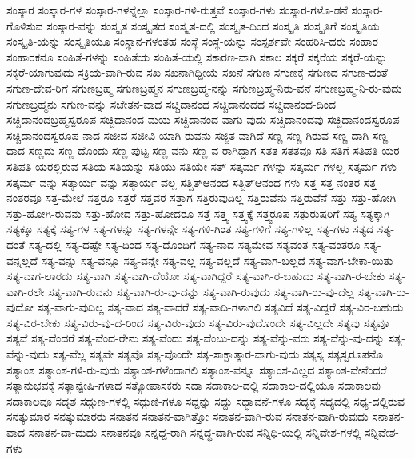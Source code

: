 {ಸಂಸ್ಕಾರ
ಸಂಸ್ಕಾರ-ಗಳ
ಸಂಸ್ಕಾರ-ಗಳನ್ನೆಲ್ಲಾ
ಸಂಸ್ಕಾರ-ಗಳಿ-ರುತ್ತವೆ
ಸಂಸ್ಕಾರ-ಗಳು
ಸಂಸ್ಕಾರ-ಗಳೊ-ಡನೆ
ಸಂಸ್ಕಾರ-ಗೊಳಿಸುವ
ಸಂಸ್ಕಾರ-ವನ್ನು
ಸಂಸ್ಕೃತ
ಸಂಸ್ಕೃತದ
ಸಂಸ್ಕೃತ-ದಲ್ಲಿ
ಸಂಸ್ಕೃತ-ದಿಂದ
ಸಂಸ್ಕೃತಿ
ಸಂಸ್ಕೃತಿಗೆ
ಸಂಸ್ಕೃತಿಯ
ಸಂಸ್ಕೃತಿ-ಯನ್ನು
ಸಂಸ್ಕೃತಿಯೂ
ಸಂಸ್ಥಾನ-ಗಳಂತಹ
ಸಂಸ್ಥೆ
ಸಂಸ್ಥೆ-ಯನ್ನು
ಸಂಸ್ಪರ್ಶವೇ
ಸಂಹರಿಸಿ-ದರು
ಸಂಹಾರ
ಸಂಹಾರಕನೂ
ಸಂಹಿತೆ-ಗಳನ್ನು
ಸಂಹಿತೆಯ
ಸಂಹಿತೆ-ಯಲ್ಲಿ
ಸಕಾರಣ-ವಾಗಿ
ಸಕಾಲ
ಸಕ್ಕರೆ
ಸಕ್ಕರೆಯ
ಸಕ್ಕರೆ-ಯನ್ನು
ಸಕ್ಕರೆ-ಯಾಗುವುದು
ಸಕ್ರಿಯ-ವಾಗಿ-ರುವ
ಸಖ
ಸಖನಾಗಿದ್ದೀಯೆ
ಸಖನೆ
ಸಗುಣ
ಸಗುಣಕ್ಕೆ
ಸಗುಣದ
ಸಗುಣ-ದಂತೆ
ಸಗುಣ-ದೇವ-ರಿಗೆ
ಸಗುಣಬ್ರಹ್ಮ
ಸಗುಣಬ್ರಹ್ಮನ
ಸಗುಣಬ್ರಹ್ಮ-ನನ್ನು
ಸಗುಣಬ್ರಹ್ಮ-ನಿರು-ವನೆ
ಸಗುಣಬ್ರಹ್ಮ-ನಿ-ರು-ವುದು
ಸಗುಣಬ್ರಹ್ಮನು
ಸಗುಣ-ವನ್ನು
ಸಚೇತನ-ವಾದ
ಸಚ್ಚಿದಾನಂದ
ಸಚ್ಚಿದಾನಂದದ
ಸಚ್ಚಿದಾನಂದ-ದಿಂದ
ಸಚ್ಚಿದಾನಂದಬ್ರಹ್ಮಸ್ವರೂಪ
ಸಚ್ಚಿದಾನಂದ-ಮಯ
ಸಚ್ಚಿದಾನಂದ-ವಾಗು-ವುದು
ಸಚ್ಚಿದಾನಂದವು
ಸಚ್ಚಿದಾನಂದಸ್ವರೂಪ
ಸಚ್ಚಿದಾನಂದಸ್ವರೂಪ-ನಾದ
ಸಜೀವ
ಸಜೀವಿ-ಯಾಗಿ-ರುವನು
ಸಜ್ಜಿತ-ವಾಗಿದೆ
ಸಣ್ಣ
ಸಣ್ಣ-ಗಿರುವ
ಸಣ್ಣ-ದಾಗಿ
ಸಣ್ಣ-ದಾದ
ಸಣ್ಣದು
ಸಣ್ಣ-ದೊಂದು
ಸಣ್ಣ-ಪುಟ್ಟ
ಸಣ್ಣ-ವನು
ಸಣ್ಣ-ವ-ರಾಗಿದ್ದಾಗ
ಸತತ
ಸತತವೂ
ಸತಿ
ಸತಿಗೆ
ಸತಿಪತಿ-ಯರ
ಸತಿಪತಿ-ಯರಲ್ಲಿರುವ
ಸತಿಯ
ಸತಿಯನ್ನು
ಸತಿಯು
ಸತಿಯೇ
ಸತ್
ಸತ್ಕರ್ಮ-ಗಳನ್ನು
ಸತ್ಕರ್ಮ-ಗಳಲ್ಲ
ಸತ್ಕರ್ಮ-ಗಳು
ಸತ್ಕರ್ಮ-ವನ್ನು
ಸತ್ಕಾರ್ಯ-ವನ್ನು
ಸತ್ಕಾರ್ಯ-ವಲ್ಲ
ಸತ್ಚಿತ್ಆನಂದ
ಸತ್ಚಿತ್ಆನಂದ-ಗಳು
ಸತ್ತ
ಸತ್ತ-ನಂತರ
ಸತ್ತ-ನಂತರವೂ
ಸತ್ತ-ಮೇಲೆ
ಸತ್ತರೂ
ಸತ್ತರೆ
ಸತ್ತವರ
ಸತ್ತಾಗ
ಸತ್ತಿರುವುದಿಲ್ಲ
ಸತ್ತಿರುವೆನು
ಸತ್ತಿರುವೆನೆ
ಸತ್ತು
ಸತ್ತು-ಹೋಗಿ
ಸತ್ತು-ಹೋಗಿ-ರುವನು
ಸತ್ತು-ಹೋದ
ಸತ್ತು-ಹೋದರೂ
ಸತ್ತೆ
ಸತ್ತ್ವ
ಸತ್ತ್ವಕ್ಕೆ
ಸತ್ತ್ವರೂಪ
ಸತ್ಪುರುಷರಿಗೆ
ಸತ್ಯ
ಸತ್ಯಕ್ಕಾಗಿ
ಸತ್ಯಕ್ಕೂ
ಸತ್ಯಕ್ಕೆ
ಸತ್ಯ-ಗಳ
ಸತ್ಯ-ಗಳನ್ನು
ಸತ್ಯ-ಗಳನ್ನೇ
ಸತ್ಯ-ಗಳಿ-ಗಿಂತ
ಸತ್ಯ-ಗಳಿಗೆ
ಸತ್ಯ-ಗಳಿಲ್ಲ
ಸತ್ಯ-ಗಳು
ಸತ್ಯದ
ಸತ್ಯ-ದಂತೆ
ಸತ್ಯ-ದಲ್ಲಿ
ಸತ್ಯ-ದಷ್ಟೇ
ಸತ್ಯ-ದಿಂದ
ಸತ್ಯ-ದೊಂದಿಗೆ
ಸತ್ಯ-ನಾದ
ಸತ್ಯಮೇವ
ಸತ್ಯವಂತ
ಸತ್ಯ-ವಂತರೂ
ಸತ್ಯ-ವನ್ನಲ್ಲದೆ
ಸತ್ಯ-ವನ್ನು
ಸತ್ಯ-ವನ್ನೂ
ಸತ್ಯ-ವನ್ನೇ
ಸತ್ಯ-ವಲ್ಲ
ಸತ್ಯ-ವಲ್ಲದೆ
ಸತ್ಯ-ವಾಗ-ಬಲ್ಲದೆ
ಸತ್ಯ-ವಾಗ-ಬೇಕಾ-ಯಿತು
ಸತ್ಯ-ವಾಗ-ಲಾರದು
ಸತ್ಯ-ವಾಗಿ
ಸತ್ಯ-ವಾಗಿ-ದೆಯೋ
ಸತ್ಯ-ವಾಗಿದ್ದರೆ
ಸತ್ಯ-ವಾಗಿ-ರ-ಬಹುದು
ಸತ್ಯ-ವಾಗಿ-ರ-ಬೇಕು
ಸತ್ಯ-ವಾಗಿ-ರಲೇ
ಸತ್ಯ-ವಾಗಿ-ರುವನು
ಸತ್ಯ-ವಾಗಿ-ರು-ವು-ದನ್ನು
ಸತ್ಯ-ವಾಗಿ-ರುವುದು
ಸತ್ಯ-ವಾಗಿ-ರು-ವು-ದೆಲ್ಲ
ಸತ್ಯ-ವಾಗಿ-ರು-ವುದೋ
ಸತ್ಯ-ವಾಗು-ವುದಿಲ್ಲ
ಸತ್ಯ-ವಾದ
ಸತ್ಯ-ವಾದರೆ
ಸತ್ಯ-ವಾದಿ-ಗಳಾಗಲಿ
ಸತ್ಯವಿದೆ
ಸತ್ಯ-ವಿದ್ದರೆ
ಸತ್ಯ-ವಿರ-ಬಹುದು
ಸತ್ಯ-ವಿರ-ಬೇಕು
ಸತ್ಯ-ವಿರು-ವು-ದ-ರಿಂದ
ಸತ್ಯ-ವಿರು-ವುದು
ಸತ್ಯ-ವಿರು-ವುದೊಂದೇ
ಸತ್ಯ-ವಿಲ್ಲದೇ
ಸತ್ಯವು
ಸತ್ಯವೂ
ಸತ್ಯವೆ
ಸತ್ಯ-ವೆಂದರೆ
ಸತ್ಯ-ವೆಂದ-ರೇನು
ಸತ್ಯ-ವೆಂದು
ಸತ್ಯ-ವೆಂಬು-ದನ್ನು
ಸತ್ಯ-ವೆನ್ನು-ವರು
ಸತ್ಯ-ವೆನ್ನು-ವು-ದನ್ನು
ಸತ್ಯ-ವೆನ್ನು-ವುದು
ಸತ್ಯ-ವೆಲ್ಲ
ಸತ್ಯವೇ
ಸತ್ಯವೊ
ಸತ್ಯ-ವೊಂದೇ
ಸತ್ಯ-ಸಾಕ್ಷಾತ್ಕಾರ-ವಾಗು-ವುದು
ಸತ್ಯಸ್ಯ
ಸತ್ಯಸ್ವರೂಪನೊ
ಸತ್ಯಾಂಶ
ಸತ್ಯಾಂಶ-ಗಳಿ-ರು-ವುದು
ಸತ್ಯಾಂಶ-ಗಳೆಂದಾಗಲಿ
ಸತ್ಯಾಂಶ-ವನ್ನೂ
ಸತ್ಯಾಂಶ-ವಿಲ್ಲದ
ಸತ್ಯಾಂಶ-ವೇನೆಂದರೆ
ಸತ್ಯಾನುಭವಕ್ಕೆ
ಸತ್ಯಾನ್ವೇಷಿ-ಗಳಾದ
ಸತ್ಯೋಪಾಸಕರು
ಸದಾ
ಸದಾಕಾಲ-ದಲ್ಲಿ
ಸದಾಕಾಲ-ದಲ್ಲಿಯೂ
ಸದಾಕಾಲವು
ಸದಾಕಾಲವೂ
ಸದೃಶ
ಸದ್ಗುಣ-ಗಳಲ್ಲಿ
ಸದ್ಗುಣಿ-ಗಳೂ
ಸದ್ದನ್ನು
ಸದ್ದು
ಸದ್ಭಾವನೆ-ಗಳೂ
ಸದ್ಯಕ್ಕೆ
ಸದ್ಯದಲ್ಲಿ
ಸಧ್ಯ-ದಲ್ಲಿರುವ
ಸನತ್ಕುಮಾರ
ಸನತ್ಕುಮಾರರು
ಸನಾತನ
ಸನಾತನ-ವಾಗಿತ್ತೋ
ಸನಾತನ-ವಾಗಿ-ರುವ
ಸನಾತನ-ವಾಗಿ-ರುವುದು
ಸನಾತನ-ವಾದ
ಸನಾತನ-ವಾ-ದುದು
ಸನಾತನವೂ
ಸನ್ನದ್ದ-ರಾಗಿ
ಸನ್ನದ್ಧ-ವಾಗಿ-ರುವ
ಸನ್ನಿಧಿ-ಯಲ್ಲಿ
ಸನ್ನಿವೇಶ-ಗಳಲ್ಲಿ
ಸನ್ನಿವೇಶ-ಗಳು
}
